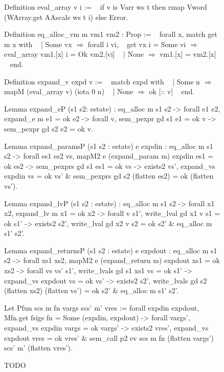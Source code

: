 \documentclass{article}
\begin{document}
\begin{figure}[tp] %
\obeylines\obeyspaces\ttfamily%
Definition eval\_array v i :=
~ if v is Varr ws t then rmap Vword (WArray.get AAscale ws t i) else Error.

Definition eq\_alloc\_vm m vm1 vm2 : Prop :=
~ forall x, match get m x with
~ | Some vx \(\Rightarrow\) forall i vi,
~   get vx i = Some vi \(\Longrightarrow\) eval\_array vm1.[x] i = Ok vm2.[vi]
~ | None \(\Rightarrow\) vm1.[x] = vm2.[x]
~ end.

Definition expand\_v expd v :=
~ match expd with
~ | Some n \(\Rightarrow\) mapM (eval\_array v) (iota 0 n)
~ | None   \(\Rightarrow\) ok [:: v]
~ end.

Lemma expand_eP (s1 s2: estate) :
  eq_alloc m s1 s2 ->
  forall e1 e2, expand_e m e1 = ok e2 -> 
  forall v, sem_pexpr gd s1 e1 = ok v ->
            sem_pexpr gd s2 e2 = ok v.

Lemma expand_paramsP (s1 s2 : estate) e expdin :
  eq_alloc m s1 s2 ->
  forall es1 es2 vs, mapM2 e (expand_param m) expdin es1 = ok es2 ->
    sem_pexprs gd s1 es1 = ok vs ->
    exists2 vs', expand_vs expdin vs = ok vs' &
      sem_pexprs gd s2 (flatten es2) = ok (flatten vs').

Lemma expand_lvP (s1 s2 : estate) :
  eq_alloc m s1 s2 ->
  forall x1 x2, expand_lv m x1 = ok x2 ->
  forall v s1',
    write_lval gd x1 v s1 = ok s1' ->
    exists2 s2', write_lval gd x2 v s2 = ok s2' & eq_alloc m s1' s2'.

Lemma expand_returnsP (s1 s2 : estate) e expdout :
  eq_alloc m s1 s2 ->
  forall xs1 xs2, mapM2 e (expand_return m) expdout xs1 = ok xs2 ->
  forall vs vs' s1',
    write_lvals gd s1 xs1 vs = ok s1' ->
    expand_vs expdout vs = ok vs' ->
    exists2 s2', write_lvals gd s2 (flatten xs2) (flatten vs') = ok s2' &
      eq_alloc m s1' s2'.

Let Pfun scs m fn vargs scs' m' vres :=
  forall expdin expdout, Mfn.get fsigs fn = Some (expdin, expdout) ->
  forall vargs', expand_vs expdin vargs = ok vargs' ->
  exists2 vres', expand_vs expdout vres = ok vres' &
    sem_call p2 ev scs m fn (flatten vargs') scs' m' (flatten vres').
\normalfont%
\caption{TODO}
\end{figure}

\end{document}

